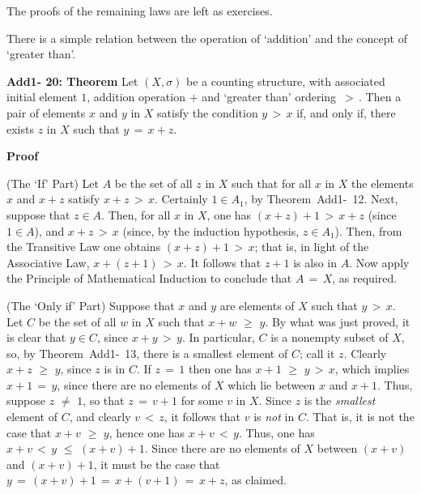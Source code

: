 {\V

        The proofs of the remaining laws are left as exercises.


\V
\V

        There is a simple relation between the operation of `addition' and the concept of `greater than'.

\V

        {\bf Add1- 20: Theorem} Let $(X,{\sigma})$ be a counting structure, with associated initial element $1$,
    addition operation $+$ and `greater than' ordering $\,>\,$.
    Then a pair of elements $x$ and $y$ in $X$ satisfy the condition $y\,>\,x$ if, and only if, there exists $z$ in $X$ such that $y \,=\, x+z$.

\V

        {\bf Proof}  

\V

        (The `If' Part) Let $A$ be the set of all $z$ in $X$ such that for all $x$ in $X$ the elements $x$ and $x+z$ satisfy $x+z\,>\,x$.
    Certainly $1{\in}A_{1}$,  by Theorem~Add1-~12.
    Next, suppose that $z{\in}A$.
    Then, for all $x$ in $X$, one has $(x+z)+1\,>\,x+z$ (since $1{\in}A$), and $x+z\,>\,x$ (since, by the induction hypothesis, $z{\in}A_{1}$).
    Then, from the Transitive Law one obtains $(x+z)+1\,>\,x$; that is, in light of the Associative Law, $x+(z+1)\,>\,x$.
    It follows that $z+1$ is also in $A$.
    Now apply the Principle of Mathematical Induction to conclude that $A \,=\, X$, as required.

\V

        (The `Only if' Part) Suppose that $x$ and $y$ are elements of $X$ such that $y\,>\,x$.
    Let $C$ be the set of all $w$ in $X$ such that $x+w\,\,{\geq}\,\,y$.
    By what was just proved, it is clear that $y{\in}C$, since $x+y\,>\,y$.
    In particular, $C$ is a nonempty subset of $X$, so, by Theorem~Add1-~13, there is a smallest element of $C$; call it $z$.
    Clearly $x+z\,\,{\geq}\,\,y$, since $z$ is in $C$. If $z \,=\, 1$ then one has $x+1\,\,{\geq}\,\,y\,>\,x$,
    which implies $x+1 \,=\, y$, since there  are no elements of $X$ which lie between $x$ and $x+1$.
    Thus, suppose $z \,\,{\neq}\,\, 1$, so that $z \,=\, v+1$ for some $v$ in $X$.
    Since $z$ is the {\em smallest} element of $C$, and clearly $v\,<\,z$, it follows that $v$ is {\em not} in $C$.
    That is, it is not the case that $x+v\,\,{\geq}\,\,y$, hence one has $x+v\,<\,y$.
    Thus, one has $x+v\,<\,y\,\,{\leq}\,\,(x+v)+1$. Since there are no elements of $X$ between $(x+v)$ and $(x+v)+1$,
    it must be the case that $y \,=\, (x+v)+1 \,=\, x+(v+1) \,=\, x+z$, as claimed.

}
